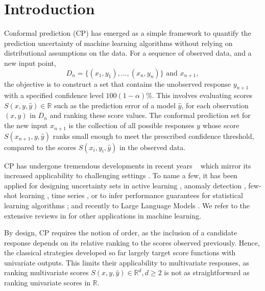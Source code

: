 
\section{Introduction}

Conformal prediction (CP) \cite{gammerman1998learning, Vovk_Gammerman_Shafer05, Shafer_Vovk08} has emerged as a simple framework to quantify the prediction uncertainty of machine learning algorithms without relying on distributional assumptions on the data. For a sequence of observed data, and a new input point,
$$D_n = \{(x_1, y_1), ..., (x_n, y_n)\} \text{ and } x_{n+1},$$
the objective is to construct a set that contains the unobserved response $y_{n+1}$ with a specified confidence level $100(1- \alpha)\%$. This involves evaluating scores $S(x, y, \hat y)\in\mathbb{R}$ such as the prediction error of a model $\hat y$, for each observation $(x, y)$ in $D_n$ and ranking these score values. The conformal prediction set for the new input $x_{n+1}$ is the collection of all possible responses $y$ whose score $S(x_{n+1}, y, \hat y)$ ranks small enough to meet the prescribed confidence threshold, compared to the scores $S(x_i, y_i, \hat y)$ in the observed data. 

CP has undergone tremendous developments in recent years ~\citep{barber2023conformal,park2024semiparametric,tibshirani2019conformal, guha2024conformal} which mirror its increased applicability to challenging settings \citep{straitouri2023improving,lu2022fair}. To name a few, it has been applied for designing uncertainty sets in active learning \citep{Ho_Wechsler08}, anomaly detection \citep{Laxhammar_Falkman15, Bates_Candes_Lei_Romano_Sesia21}, few-shot learning \citep{Fisch_Schuster_Jaakkola_Barzilay21}, time series \citep{Chernozhukov_Wuthrich_Zhu18, Xu_Xie20, chernozhukov2021exact, Lin_Trivedi_Sun22, zaffran2022adaptive}, or to infer performance guarantees for statistical learning algorithms \citep{Holland20, Cella_Martin20}; and recently to Large Language Models \cite{kumar2023conformal, quach2023conformal}. We refer to the extensive reviews in \citep{balasubramanian2014conformal} for other applications in machine learning.  

By design, CP requires the notion of order, as the inclusion of a candidate response depends on its relative ranking to the scores observed previously. Hence, the classical strategies developed so far largely target score functions with univariate outputs. This limits their applicability to multivariate responses, as ranking multivariate scores $S(x, y, \hat y) \in \mathbb{R}^d, d\geq 2$ is not as straightforward as ranking univariate scores in $\mathbb{R}$. 

